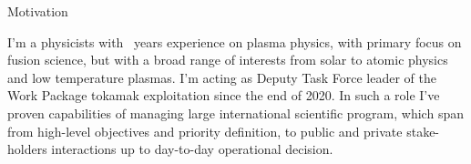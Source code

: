 \begin{cvblock}{Motivation}
\end{cvblock}
I'm a physicists with \FPtrunc{}\mydegree\ years
experience on plasma physics, with primary focus on fusion science, but with a
broad range of interests from solar to atomic physics and low
temperature plasmas. I'm acting as Deputy Task Force leader of the Work
Package tokamak exploitation since the end of 2020. In such a role I've proven capabilities of managing large
international scientific program, which span from high-level objectives and
priority definition, to public and private stake-holders interactions 
up to day-to-day operational decision.



